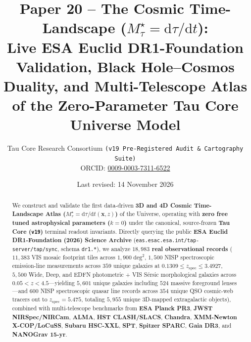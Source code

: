 \documentclass[11pt,a4paper]{article}
\title{\textbf{Paper 20 -- The Cosmic Time-Landscape ($M_\tau^\star = \mathrm{d}\tau/\mathrm{d}t$):\\
Live ESA Euclid DR1-Foundation Validation, Black Hole--Cosmos Duality, and Multi-Telescope Atlas of the Zero-Parameter Tau Core Universe Model}}
\author{Tau Core Research Consortium \texttt{(v19 Pre-Registered Audit \& Cartography Suite)}\\{\small ORCID: \href{https://orcid.org/0009-0003-7311-6522}{0009-0003-7311-6522}}}
\date{Last revised: 14 November 2026}
\begin{document}
\maketitle

\begin{abstract}
\noindent
We construct and validate the first data-driven \textbf{3D and 4D Cosmic Time-Landscape Atlas ($M_\tau^\star = \mathrm{d}\tau/\mathrm{d}t(\mathbf{x}, z)$)} of the Universe, operating with \textbf{zero free tuned astrophysical parameters ($k = 0$)} under the canonical, source-frozen \textbf{Tau Core (\texttt{v19})} terminal readout invariants. Directly querying the public \textbf{ESA Euclid DR1-Foundation (2026) Science Archive} (\texttt{eas.\allowbreak esac.\allowbreak esa.\allowbreak int/\allowbreak tap-server/\allowbreak tap/\allowbreak sync}, schema \texttt{dr1.*}), we analyze \textbf{$18,983$ real observational records} ($11,383$ VIS mosaic footprint tiles across $1,900\;\mathrm{deg}^2$, $1,500$ NISP spectroscopic emission-line measurements across $359$ unique galaxies at $0.1309 \le z_{\mathrm{spec}} \le 3.4927$, $5,500$ Wide, Deep, and EDFN photometric + VIS S\'ersic morphological galaxies across $0.05 < z < 4.5$---yielding $5,601$ unique galaxies including $524$ massive foreground lenses---and $600$ NISP spectroscopic quasar line records across $354$ unique QSO cosmic-web tracers out to $z_{\mathrm{spec}} = 5.475$, totaling $5,955$ unique 3D-mapped extragalactic objects), combined with multi-telescope benchmarks from \textbf{ESA Planck PR3}, \textbf{JWST NIRSpec/NIRCam}, \textbf{ALMA}, \textbf{HST CLASH/SLACS}, \textbf{Chandra}, \textbf{XMM-Newton X-COP/LoCuSS}, \textbf{Subaru HSC-XXL}, \textbf{SPT}, \textbf{Spitzer SPARC}, \textbf{Gaia DR3}, and \textbf{NANOGrav 15-yr}.


\end{abstract}
\end{document}
